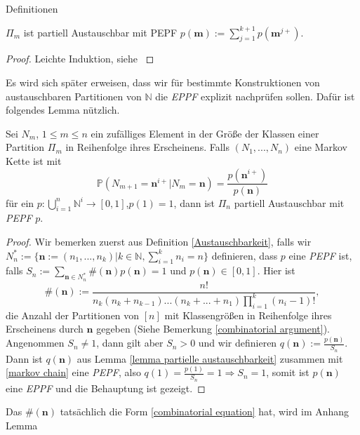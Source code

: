 \begin{section}{Definitionen}
\begin{lemma}
\begin{center} 
    $\Pi_m$ ist partiell Austauschbar mit PEPF $p(\textbf{m}):=  \sum_{j=1}^{k+1} p(\textbf{m}^{j+})$.
\end{center}
\end{lemma}
\begin{proof}
    Leichte Induktion, siehe \cite[Proposition 10]{pitman1995exchangeable}
\end{proof}
\begin{Bemerkung}
    Es wird sich später erweisen, dass wir für bestimmte Konstruktionen von austauschbaren Partitionen von $\mathbb{N}$ die \textit{EPPF} explizit nachprüfen sollen. Dafür ist folgendes Lemma nützlich.
\end{Bemerkung}
\begin{lemma}
    \label{Austauschbar Lemma}
    Sei $N_m$, $1 \leq m \leq n$ ein zufälliges Element in der Größe der Klassen einer Partition $\Pi_m$ in Reihenfolge ihres Erscheinens. Falls $(N_1,...,N_n)$ eine Markov Kette ist mit 
    \begin{equation}
    \label{markov chain}
    \mathbb{P}(N_{m+1} = \textbf{n}^{i+} | N_{m} = \textbf{n}) = \frac{p(\textbf{n}^{i+})}{p(\textbf{n})} 
    \end{equation}
   für ein $p: \bigcup_{i = 1}^{n}\mathbb{N}^i \rightarrow [0,1]$,$p(1) = 1$, dann ist $\Pi_n$ partiell Austauschbar mit \textit{PEPF} $p$.
\end{lemma}
\begin{proof}
    Wir bemerken zuerst aus Definition \ref{Austauschbarkeit}, falls wir $N^*_n:= \{\textbf{n}:= (n_1,...,n_k)|k \in \mathbb{N},\sum_{i=1}^{k}n_i = n\}$ definieren, dass $p$ eine \textit{PEPF} ist, falls $S_n := \sum_{\textbf{n} \in N^*_n}\#(\textbf{n})p(\textbf{n}) = 1$ und $p(\textbf{n}) \in [0,1]$. Hier ist 
    \begin{equation}
        \label{combinatorial equation}
        \#(\textbf{n}):= \frac{n!}{n_k(n_k + n_{k-1})...(n_k+...+n_1)\prod_{i=1}^{k}(n_i-1)!},
    \end{equation}
    die Anzahl der Partitionen von $[n]$ mit Klassengrößen in Reihenfolge ihres Erscheinens durch $\textbf{n}$ gegeben (Siehe Bemerkung \ref{combinatorial argument}). Angenommen $S_n \neq 1$, dann gilt aber $S_n> 0$ und wir definieren $q(\textbf{n}) := \frac{p(\textbf{n})}{S_n}$. Dann ist $q(\textbf{n})$ aus Lemma \ref{lemma partielle austauschbarkeit} zusammen mit \ref{markov chain} eine \textit{PEPF}, also $q(1) = \frac{p(1)}{S_n} = 1 \Rightarrow S_n =1$, somit ist $p(\textbf{n})$ eine \textit{EPPF} und die Behauptung ist gezeigt. 
\end{proof}
\begin{Bemerkung}
    Das $\#(\textbf{n})$ tatsächlich die Form \ref{combinatorial equation} hat, wird im Anhang Lemma
\end{Bemerkung}
\end{section}